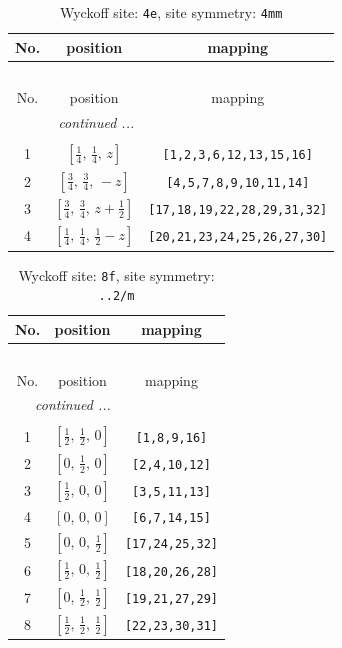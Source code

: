 \documentclass[fleqn,8pt]{jsarticle}
\begin{document}
\renewcommand{\arraystretch}{1.2}
\begin{longtable}{ccc}
\caption{Wyckoff site: {\tt 4e}, site symmetry: {\tt 4mm}}
 \\
 \hline \hline
No. & position & mapping \\ \hline \endfirsthead

\multicolumn{2}{l}{\tablename\ \thetable{}} \\
 \hline \hline
No. & position & mapping \\ \hline \endhead

 \hline \hline
\multicolumn{2}{r}{\footnotesize\it continued ...} \\ \endfoot

 \hline \hline
\multicolumn{2}{r}{} \\ \endlastfoot

1 & $\left[ \frac{1}{4},\, \frac{1}{4},\, z \right]$ & {\tt [1,2,3,6,12,13,15,16]} \\ \hline
2 & $\left[ \frac{3}{4},\, \frac{3}{4},\, - z \right]$ & {\tt [4,5,7,8,9,10,11,14]} \\ \hline
3 & $\left[ \frac{3}{4},\, \frac{3}{4},\, z + \frac{1}{2} \right]$ & {\tt [17,18,19,22,28,29,31,32]} \\ \hline
4 & $\left[ \frac{1}{4},\, \frac{1}{4},\, \frac{1}{2} - z \right]$ & {\tt [20,21,23,24,25,26,27,30]} \\
\end{longtable}
\renewcommand{\arraystretch}{1.2}
\begin{longtable}{ccc}
\caption{Wyckoff site: {\tt 8f}, site symmetry: {\tt ..2/m}}
 \\
 \hline \hline
No. & position & mapping \\ \hline \endfirsthead

\multicolumn{2}{l}{\tablename\ \thetable{}} \\
 \hline \hline
No. & position & mapping \\ \hline \endhead

 \hline \hline
\multicolumn{2}{r}{\footnotesize\it continued ...} \\ \endfoot

 \hline \hline
\multicolumn{2}{r}{} \\ \endlastfoot

1 & $\left[ \frac{1}{2},\, \frac{1}{2},\, 0 \right]$ & {\tt [1,8,9,16]} \\ \hline
2 & $\left[ 0,\, \frac{1}{2},\, 0 \right]$ & {\tt [2,4,10,12]} \\ \hline
3 & $\left[ \frac{1}{2},\, 0,\, 0 \right]$ & {\tt [3,5,11,13]} \\ \hline
4 & $\left[ 0,\, 0,\, 0 \right]$ & {\tt [6,7,14,15]} \\ \hline
5 & $\left[ 0,\, 0,\, \frac{1}{2} \right]$ & {\tt [17,24,25,32]} \\ \hline
6 & $\left[ \frac{1}{2},\, 0,\, \frac{1}{2} \right]$ & {\tt [18,20,26,28]} \\ \hline
7 & $\left[ 0,\, \frac{1}{2},\, \frac{1}{2} \right]$ & {\tt [19,21,27,29]} \\ \hline
8 & $\left[ \frac{1}{2},\, \frac{1}{2},\, \frac{1}{2} \right]$ & {\tt [22,23,30,31]} \\
\end{longtable}
\end{document}
